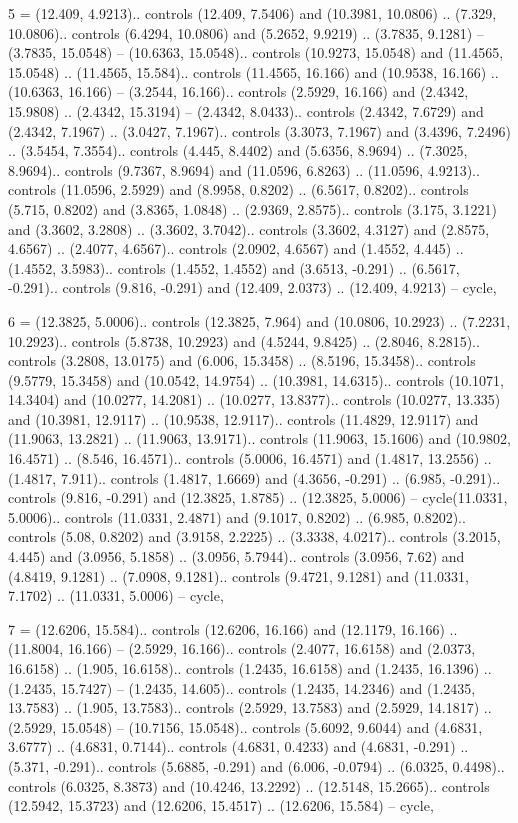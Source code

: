 5 = {(12.409, 4.9213).. controls (12.409, 7.5406) and (10.3981, 10.0806) .. (7.329, 10.0806).. controls (6.4294, 10.0806) and (5.2652, 9.9219) .. (3.7835, 9.1281) -- (3.7835, 15.0548) -- (10.6363, 15.0548).. controls (10.9273, 15.0548) and (11.4565, 15.0548) .. (11.4565, 15.584).. controls (11.4565, 16.166) and (10.9538, 16.166) .. (10.6363, 16.166) -- (3.2544, 16.166).. controls (2.5929, 16.166) and (2.4342, 15.9808) .. (2.4342, 15.3194) -- (2.4342, 8.0433).. controls (2.4342, 7.6729) and (2.4342, 7.1967) .. (3.0427, 7.1967).. controls (3.3073, 7.1967) and (3.4396, 7.2496) .. (3.5454, 7.3554).. controls (4.445, 8.4402) and (5.6356, 8.9694) .. (7.3025, 8.9694).. controls (9.7367, 8.9694) and (11.0596, 6.8263) .. (11.0596, 4.9213).. controls (11.0596, 2.5929) and (8.9958, 0.8202) .. (6.5617, 0.8202).. controls (5.715, 0.8202) and (3.8365, 1.0848) .. (2.9369, 2.8575).. controls (3.175, 3.1221) and (3.3602, 3.2808) .. (3.3602, 3.7042).. controls (3.3602, 4.3127) and (2.8575, 4.6567) .. (2.4077, 4.6567).. controls (2.0902, 4.6567) and (1.4552, 4.445) .. (1.4552, 3.5983).. controls (1.4552, 1.4552) and (3.6513, -0.291) .. (6.5617, -0.291).. controls (9.816, -0.291) and (12.409, 2.0373) .. (12.409, 4.9213) -- cycle},

6 = {(12.3825, 5.0006).. controls (12.3825, 7.964) and (10.0806, 10.2923) .. (7.2231, 10.2923).. controls (5.8738, 10.2923) and (4.5244, 9.8425) .. (2.8046, 8.2815).. controls (3.2808, 13.0175) and (6.006, 15.3458) .. (8.5196, 15.3458).. controls (9.5779, 15.3458) and (10.0542, 14.9754) .. (10.3981, 14.6315).. controls (10.1071, 14.3404) and (10.0277, 14.2081) .. (10.0277, 13.8377).. controls (10.0277, 13.335) and (10.3981, 12.9117) .. (10.9538, 12.9117).. controls (11.4829, 12.9117) and (11.9063, 13.2821) .. (11.9063, 13.9171).. controls (11.9063, 15.1606) and (10.9802, 16.4571) .. (8.546, 16.4571).. controls (5.0006, 16.4571) and (1.4817, 13.2556) .. (1.4817, 7.911).. controls (1.4817, 1.6669) and (4.3656, -0.291) .. (6.985, -0.291).. controls (9.816, -0.291) and (12.3825, 1.8785) .. (12.3825, 5.0006) -- cycle(11.0331, 5.0006).. controls (11.0331, 2.4871) and (9.1017, 0.8202) .. (6.985, 0.8202).. controls (5.08, 0.8202) and (3.9158, 2.2225) .. (3.3338, 4.0217).. controls (3.2015, 4.445) and (3.0956, 5.1858) .. (3.0956, 5.7944).. controls (3.0956, 7.62) and (4.8419, 9.1281) .. (7.0908, 9.1281).. controls (9.4721, 9.1281) and (11.0331, 7.1702) .. (11.0331, 5.0006) -- cycle},

7 = {(12.6206, 15.584).. controls (12.6206, 16.166) and (12.1179, 16.166) .. (11.8004, 16.166) -- (2.5929, 16.166).. controls (2.4077, 16.6158) and (2.0373, 16.6158) .. (1.905, 16.6158).. controls (1.2435, 16.6158) and (1.2435, 16.1396) .. (1.2435, 15.7427) -- (1.2435, 14.605).. controls (1.2435, 14.2346) and (1.2435, 13.7583) .. (1.905, 13.7583).. controls (2.5929, 13.7583) and (2.5929, 14.1817) .. (2.5929, 15.0548) -- (10.7156, 15.0548).. controls (5.6092, 9.6044) and (4.6831, 3.6777) .. (4.6831, 0.7144).. controls (4.6831, 0.4233) and (4.6831, -0.291) .. (5.371, -0.291).. controls (5.6885, -0.291) and (6.006, -0.0794) .. (6.0325, 0.4498).. controls (6.0325, 8.3873) and (10.4246, 13.2292) .. (12.5148, 15.2665).. controls (12.5942, 15.3723) and (12.6206, 15.4517) .. (12.6206, 15.584) -- cycle},

